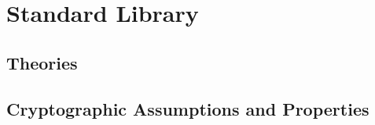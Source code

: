 
\chapter{Standard Library\label{chap:libraries}}
\section{Theories}

\section{Cryptographic Assumptions and Properties}

